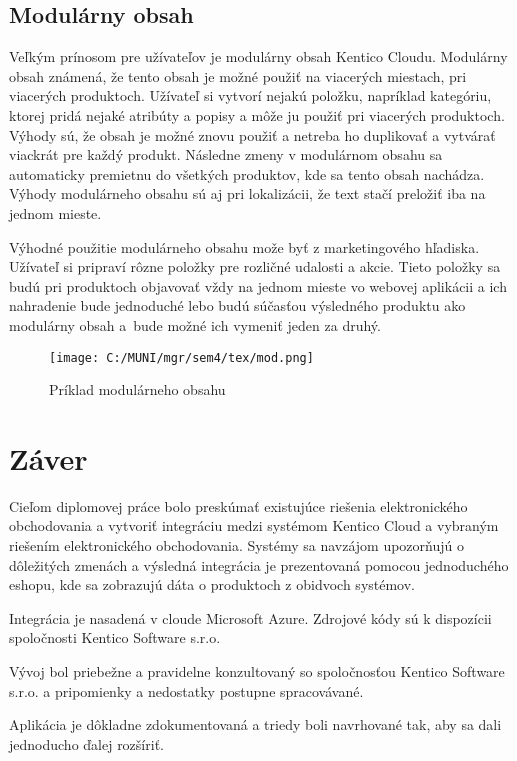 \documentclass[
  printed, %
  table,   %
  lof,     %
  nolot,     %
  twoside,  
]{fithesis3}
\begin{document}
\section{Modulárny obsah}
Veľkým prínosom pre užívateľov je modulárny obsah Kentico Cloudu. Modulárny obsah známená, že tento obsah je možné použiť na viacerých miestach, pri viacerých produktoch. Užívateľ si vytvorí nejakú položku, napríklad kategóriu, ktorej pridá nejaké atribúty a popisy a môže ju použiť pri viacerých produktoch. Výhody sú, že obsah je možné znovu použiť a netreba ho duplikovať a vytvárať viackrát pre každý produkt. Následne zmeny v modulárnom obsahu sa automaticky premietnu do všetkých produktov, kde sa tento obsah nachádza. 
Výhody modulárneho obsahu sú aj pri lokalizácii, že text stačí preložiť iba na jednom mieste.

Výhodné použitie modulárneho obsahu može byť z marketingového hľadiska. Užívateľ si pripraví rôzne položky pre rozličné udalosti a akcie. Tieto položky sa budú pri produktoch objavovať vždy na jednom mieste vo webovej aplikácii a ich nahradenie bude jednoduché lebo budú súčasťou výsledného produktu ako modulárny obsah a~bude možné ich vymeniť jeden za druhý.

\begin{figure}[h]
  \begin{center}
        \texttt{[image: C:/MUNI/mgr/sem4/tex/mod.png]}
  \end{center}
  \caption{ Príklad modulárneho obsahu \cite{kcdash}}
  \label{fig:modular}
\end{figure}

\chapter{Záver}
Cieľom diplomovej práce bolo preskúmať existujúce riešenia elektronického obchodovania a vytvoriť integráciu medzi systémom Kentico Cloud a vybraným riešením elektronického obchodovania. Systémy sa navzájom upozorňujú o dôležitých zmenách a výsledná integrácia je prezentovaná pomocou jednoduchého eshopu, kde sa zobrazujú dáta o produktoch z obidvoch systémov.

Integrácia je nasadená v cloude Microsoft Azure. Zdrojové kódy sú k dispozícii spoločnosti Kentico Software s.r.o. 

Vývoj bol priebežne a pravidelne konzultovaný so spoločnosťou Kentico Software s.r.o. a pripomienky a nedostatky postupne spracovávané.

Aplikácia je dôkladne zdokumentovaná a triedy boli navrhované tak, aby sa dali jednoducho ďalej rozšíriť.
\end{document}
